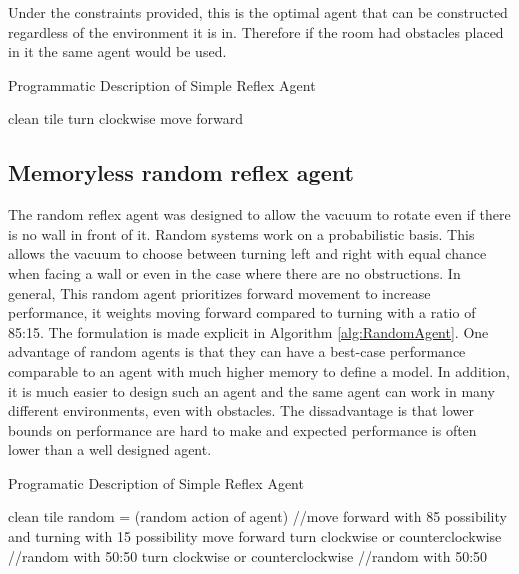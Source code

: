 \documentclass{article}
\begin{document}
Under the constraints provided, this is the optimal agent that can be constructed regardless of the environment it is in. Therefore if the room had obstacles placed in it the same agent would be used. 
\begin{algorithm}[h]
  
  \caption{Programmatic Description of Simple Reflex Agent}
  \begin{algorithmic}[1]
    
    \State clean tile 
    \EndIf
    \State turn clockwise
    \EndIf
    \State move forward
    \EndIf
    \EndFor
  \end{algorithmic}
  \label{alg:SimpleAgent}
\end{algorithm}
\subsection{Memoryless random reflex agent}
The random reflex agent was designed to allow the vacuum to rotate even if there is no wall in front of it. Random systems work on a probabilistic basis. This allows the vacuum to choose between turning left and right with equal chance when facing a wall or even in the case where there are no obstructions. In general, This random agent prioritizes forward movement to increase performance, it weights moving forward compared to turning with a ratio of 85:15.
The formulation is made explicit in Algorithm \ref{alg:RandomAgent}. One advantage of random agents is that they can have a best-case performance comparable to an agent with much higher memory to define a model. In addition, it is much easier to design such an agent and the same agent can work in many different environments, even with obstacles. The dissadvantage is that lower bounds on performance are hard to make and expected performance is often lower than a well designed agent. 


\begin{algorithm}[h]
  
  \caption{Programatic Description of Simple Reflex Agent}
  \begin{algorithmic}[1]
    
    \State clean tile 
    \EndIf
    \State random = (random action of agent) //move forward with 85 possibility and turning with 15 possibility
      \State move forward
      \Else 
      \State turn clockwise or counterclockwise //random with 50:50
      \EndIf
      \State turn clockwise or counterclockwise //random with 50:50
      \EndIf
      \EndIf
     
    \EndFor
  \end{algorithmic}
  \label{alg:RandomAgent}
\end{algorithm}
\end{document}

